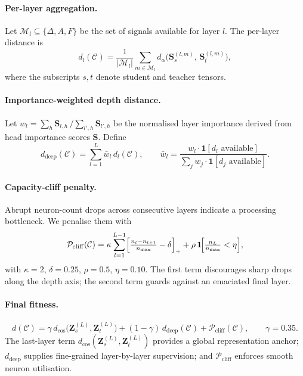 \documentclass{article}
\newcommand{\Sb}{\mathbf{S}}
\newcommand{\Zb}{\mathbf{Z}}
\newcommand{\Cc}{\mathcal{C}}
\newcommand{\Mc}{\mathcal{M}}
\newcommand{\Pc}{\mathcal{P}}
\newcommand{\bone}{\mathbf{1}}
\newcommand{\dcos}{d_{\mathrm{cos}}}
\newcommand{\dblend}{d_{\alpha}}
\newcommand{\ddeep}{d_{\mathrm{deep}}}
\begin{document}
\paragraph{Per-layer aggregation.}
Let $\Mc_l\subseteq\{\Delta,A,F\}$ be the set of signals available for
layer $l$.  The per-layer distance is
\begin{equation}
  d_l(\Cc)
  = \frac{1}{|\Mc_l|}
    \sum_{m\in\Mc_l}
    \dblend\!\bigl(\mathbf{S}^{(l,m)}_s,\,\mathbf{S}^{(l,m)}_t\bigr),
  \label{eq:dl}
\end{equation}
where the subscripts $s,t$ denote student and teacher tensors.

\paragraph{Importance-weighted depth distance.}
Let $w_l = \sum_h \Sb_{l,h}\,/\sum_{l',h}\Sb_{l',h}$ be the
normalised layer importance derived from head importance scores $\Sb$.
Define
\begin{equation}
  \ddeep(\Cc)
  = \sum_{l=1}^{L} \bar{w}_l\, d_l(\Cc),\qquad
  \bar{w}_l
  = \frac{w_l\cdot\bone[d_l\text{ available}]}
         {\sum_{j}w_j\cdot\bone[d_j\text{ available}]}.
  \label{eq:ddeep}
\end{equation}

\paragraph{Capacity-cliff penalty.}
Abrupt neuron-count drops across consecutive layers indicate a
processing bottleneck.  We penalise them with
\begin{equation}
  \Pc_{\mathrm{cliff}}(\Cc)
  = \kappa\sum_{l=1}^{L-1}\Bigl[\tfrac{n_l - n_{l+1}}{n_{\max}} - \delta\Bigr]_+
  + \rho\,\bone\!\Bigl[\tfrac{n_L}{n_{\max}} < \eta\Bigr],
  \label{eq:cliff}
\end{equation}
with $\kappa=2$, $\delta=0.25$, $\rho=0.5$, $\eta=0.10$.  The first
term discourages sharp drops along the depth axis; the second term
guards against an emaciated final layer.

\paragraph{Final fitness.}
\begin{equation}
  \boxed{
  d(\Cc)
  = \gamma\,\dcos\!\bigl(\Zb_s^{(L)},\Zb_t^{(L)}\bigr)
  + (1-\gamma)\,\ddeep(\Cc)
  + \Pc_{\mathrm{cliff}}(\Cc),
  \qquad \gamma = 0.35.}
  \label{eq:dfinal}
\end{equation}
The last-layer term $\dcos(\Zb_s^{(L)},\Zb_t^{(L)})$ provides a global
representation anchor; $\ddeep$ supplies fine-grained layer-by-layer
supervision; and $\Pc_{\mathrm{cliff}}$ enforces smooth neuron
utilisation.
\end{document}
